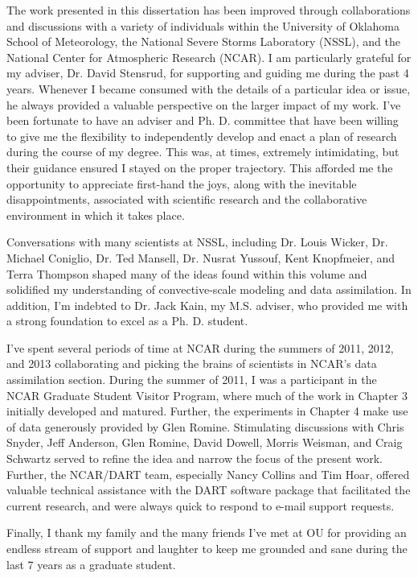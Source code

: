 \begin{preface}
The work presented in this dissertation has been improved through  collaborations and discussions with a variety of individuals within the University of Oklahoma School of Meteorology, the National Severe Storms Laboratory (NSSL), and the National Center for Atmospheric Research (NCAR). I am particularly grateful for my adviser, Dr. David Stensrud, for supporting and guiding me during the past 4 years. Whenever I became consumed with the details of a particular idea or issue, he always provided a valuable perspective on the larger impact of my work. I've been fortunate to have an adviser and Ph. D. committee that have been willing to give me the flexibility to independently develop and enact a plan of research during the course of my degree. This was, at times, extremely intimidating, but their guidance ensured I stayed on the proper trajectory. This afforded me the opportunity to appreciate first-hand the joys, along with the inevitable disappointments, associated with scientific research and the collaborative environment in which it takes place.

Conversations with many scientists at NSSL, including Dr. Louis Wicker, Dr. Michael Coniglio, Dr. Ted Mansell, Dr. Nusrat Yussouf, Kent Knopfmeier, and Terra Thompson shaped many of the ideas found within this volume and solidified my understanding of convective-scale modeling and data assimilation. In addition, I'm indebted to Dr. Jack Kain, my M.S. adviser, who provided me with a strong foundation to excel as a Ph. D. student.

I've spent several periods of time at NCAR during the summers of 2011, 2012, and 2013 collaborating and picking the brains of scientists in NCAR's data assimilation section. During the summer of 2011, I was a participant in the NCAR Graduate Student Visitor Program, where much of the work in Chapter 3 initially developed and matured. Further, the experiments in Chapter 4 make use of data generously provided by Glen Romine. Stimulating discussions with Chris Snyder, Jeff Anderson, Glen Romine, David Dowell, Morris Weisman, and Craig Schwartz served to refine the idea and narrow the focus of the present work. Further, the NCAR/DART team, especially Nancy Collins and Tim Hoar, offered valuable technical assistance with the DART software package that facilitated the current research, and were always quick to respond to e-mail support requests.

Finally, I thank my family and the many friends I've met at OU for providing an endless stream of support and laughter to keep me grounded and sane during the last 7 years as a graduate student.


\end{preface}
